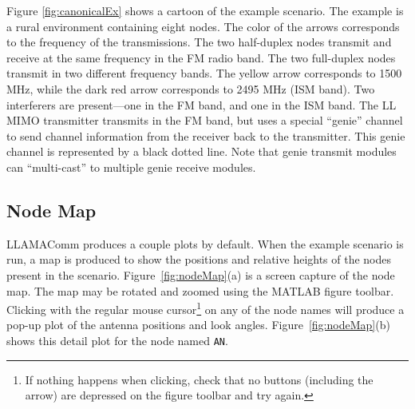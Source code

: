Figure \ref{fig:canonicalEx} shows a cartoon of the example
scenario. The example is a rural environment containing eight nodes.
The color of the arrows corresponds to the frequency of the
transmissions.  The two half-duplex nodes transmit and receive at
the same frequency in the FM radio band.  The two full-duplex nodes
transmit in two different frequency bands.  The yellow arrow
corresponds to 1500 MHz, while the dark red arrow corresponds to
2495 MHz (ISM band). Two interferers are present---one in the FM
band, and one in the ISM band. The LL MIMO transmitter transmits in
the FM band, but uses a special ``genie'' channel to send channel
information from the receiver back to the transmitter.  This genie
channel is represented by a black dotted line.  Note that genie transmit modules can ``multi-cast'' to multiple genie receive modules.

\subsection{Node Map}

LLAMAComm produces a couple plots by default.  When the example
scenario is run, a map is produced to show the positions and
relative heights of the nodes present in the scenario.
Figure~\ref{fig:nodeMap}(a) is a screen capture of the node map. The
map may be rotated and zoomed using the MATLAB figure toolbar.
Clicking with the regular mouse cursor\footnote{If nothing happens
when clicking, check that no buttons (including the arrow) are
depressed on the figure toolbar and try again.} on any of the node
names will produce a pop-up plot of the antenna positions and look
angles. Figure~\ref{fig:nodeMap}(b) shows this detail plot for the
node named \verb+AN+.

